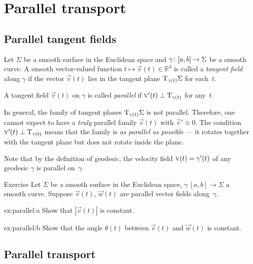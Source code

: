 \chapter{Parallel transport}
\label{chap:parallel-transport}

\section{Parallel tangent fields}

Let $\Sigma$ be a smooth surface in the Euclidean space and $\gamma\:[a,b]\z\to \Sigma$ be a smooth curve.
A smooth vector-valued function $t\mapsto {\vec v}(t) \in \mathbb{R}^3$ is called a \emph{tangent field} along $\gamma$ if
the vector ${\vec v}(t)$ lies in the tangent plane $\mathrm{T}_{\gamma(t)}\Sigma$ for each~$t$.

A tangent field ${\vec v}(t)$ on $\gamma$ is called \emph{parallel} if ${\text{\sc{v}}}'(t)\perp\mathrm{T}_{\gamma(t)}$ for any~$t$.

In general, the family of tangent planes $\mathrm{T}_{\gamma(t)}\Sigma$ is not parallel.
Therefore, one cannot expect to have a \textit{truly} parallel family ${\vec v}(t)$ with ${\vec v}'\equiv 0$.
The condition ${\text{\sc{v}}}'(t)\perp\mathrm{T}_{\gamma(t)}$ means that the family is \textit{as parallel as possible} --- it rotates together with the tangent plane but does not rotate inside the plane.

Note that by the definition of geodesic, the velocity field ${\vec v}(t)\z=\gamma'(t)$ of any geodesic $\gamma$ is parallel on~$\gamma$.

\begin{thm}{Exercise}\label{ex:parallel}
Let $\Sigma$ be a smooth surface in the Euclidean space, 
$\gamma\:[a,b]\to \Sigma$ a smooth curve.
Suppose ${\vec v}(t)$, $\vec w(t)$ are parallel vector fields along~$\gamma$.

\begin{subthm}{ex:parallel:a} Show that $|{\vec v}(t)|$ is constant.
\end{subthm}

\begin{subthm}{ex:parallel:b} Show that the angle $\theta(t)$ between ${\vec v}(t)$ and $\vec w(t)$ is constant.
\end{subthm}

\end{thm}

\section{Parallel transport}

